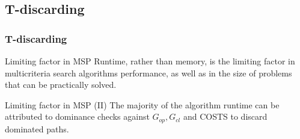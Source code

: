 \subsection{T-discarding}
\begin{frame} 
\frametitle{T-discarding}
	\begin{block}{Limiting factor in MSP}
	\vspace{1mm}
		\textcolor{ao}{Runtime}, rather than memory, is the \textcolor{ao}{limiting factor} in multicriteria search algorithms performance, as well as in the size of problems that can be practically solved.
	\vspace{1mm}
	\end{block}
	\vspace{8mm}
	\begin{block}{Limiting factor in MSP (II)}
	\vspace{1mm}
		The \textcolor{ao}{majority} of the algorithm \textcolor{ao}{runtime} can be attributed to dominance checks against $G_{op}, G_{cl}$ and COSTS to discard dominated paths. 
	\vspace{1mm}
	\end{block}
\end{frame}

